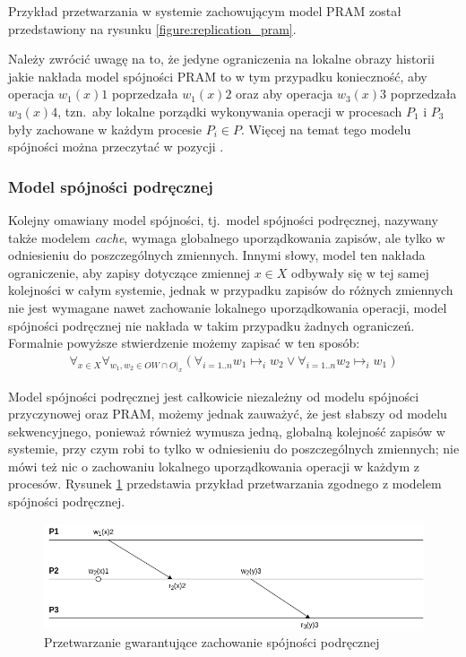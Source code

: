 Przykład przetwarzania w systemie zachowującym model PRAM został przedstawiony na rysunku \ref{figure:replication_pram}.

Należy zwrócić uwagę na to, że jedyne ograniczenia na lokalne obrazy historii jakie nakłada model
spójności PRAM to w tym przypadku konieczność, aby operacja $ w_1(x)1 $ poprzedzała $ w_1(x)2 $ oraz
aby operacja $ w_3(x)3 $ poprzedzała $ w_3(x)4 $, tzn.\ aby lokalne porządki wykonywania operacji w procesach $ P_1 $ i $ P_3 $ były zachowane w każdym procesie $ P_i \in P $. Więcej na temat tego modelu spójności można przeczytać w pozycji \cite{lipton:88}.

\subsubsection{Model spójności podręcznej}

Kolejny omawiany model spójności, tj.\ model spójności podręcznej, nazywany także modelem \textit{cache}, wymaga globalnego uporządkowania zapisów, ale tylko w odniesieniu do poszczególnych zmiennych. Innymi słowy, model ten nakłada ograniczenie, aby zapisy dotyczące zmiennej $ x \in X $ odbywały się w tej samej kolejności w całym systemie, jednak w przypadku zapisów do różnych zmiennych nie jest wymagane nawet zachowanie lokalnego uporządkowania operacji, model spójności podręcznej nie nakłada w takim przypadku żadnych ograniczeń. Formalnie powyższe stwierdzenie możemy zapisać w ten sposób:
\begin{align*}
    \forall_{x \in X} \forall_{w_1, w_2 \in OW \cap O|_x} (\forall_{i=1..n} w_1 \mapsto_i w_2 \vee \forall_{i=1..n} w_2 \mapsto_i w_1)
\end{align*}

Model spójności podręcznej jest całkowicie niezależny od modelu spójności przyczynowej oraz PRAM, możemy jednak zauważyć, że jest słabszy od modelu sekwencyjnego, ponieważ również wymusza jedną, globalną kolejność zapisów w systemie, przy czym robi to tylko w odniesieniu do poszczególnych zmiennych; nie mówi też nic o zachowaniu lokalnego uporządkowania operacji w każdym z procesów. Rysunek \ref{figure:replication_cache} przedstawia przykład przetwarzania zgodnego z modelem spójności podręcznej.

\begin{figure}
    \includegraphics[width=\linewidth]{images/02-cache.png}
    \caption{Przetwarzanie gwarantujące zachowanie spójności podręcznej}
    \label{figure:replication_cache}
\end{figure}

